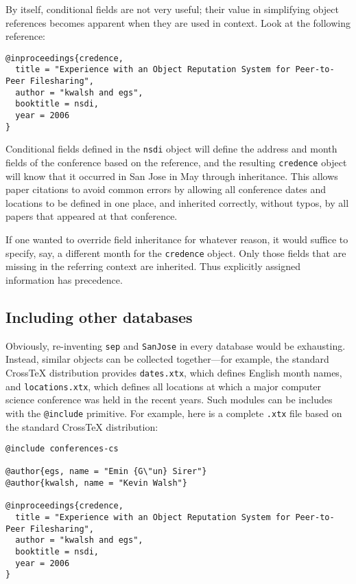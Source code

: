 \documentclass{article}
\newcommand{\XTX}{Cross\TeX}
\begin{document}
By itself, conditional fields are not very useful; their value in
simplifying object references becomes apparent when they are used in
context. Look at the following reference:

\begin{small}\begin{verbatim}
@inproceedings{credence,
  title = "Experience with an Object Reputation System for Peer-to-Peer Filesharing",
  author = "kwalsh and egs",
  booktitle = nsdi,
  year = 2006
}
\end{verbatim}\end{small}

Conditional fields defined in the \texttt{nsdi} object will define
the address and month fields of the conference based on the reference,
and the resulting \texttt{credence} object will know that it occurred
in San Jose in May through inheritance. This allows paper citations to
avoid common errors by allowing all conference dates and locations to
be defined in one place, and inherited correctly, without typos, by all
papers that appeared at that conference.

If one wanted to override field inheritance for whatever reason, it would
suffice to specify, say, a different month for the \texttt{credence}
object. Only those fields that are missing in the referring context are
inherited. Thus explicitly assigned information has precedence.

\subsection{Including other databases}

Obviously, re-inventing \texttt{sep} and \texttt{SanJose} in every
database would be exhausting. Instead, similar objects can be
collected together---for example, the standard \XTX{} distribution
provides \texttt{dates.xtx}, which defines English month names, and
\texttt{locations.xtx}, which defines all locations at which a major
computer science conference was held in the recent years.  Such modules
can be includes with the \texttt{@include} primitive.  For example,
here is a complete \texttt{.xtx} file based on the standard \XTX{}
distribution:

\begin{small}\begin{verbatim}
@include conferences-cs

@author{egs, name = "Emin {G\"un} Sirer"}
@author{kwalsh, name = "Kevin Walsh"}

@inproceedings{credence,
  title = "Experience with an Object Reputation System for Peer-to-Peer Filesharing",
  author = "kwalsh and egs",
  booktitle = nsdi,
  year = 2006
}
\end{verbatim}\end{small}
\end{document}

